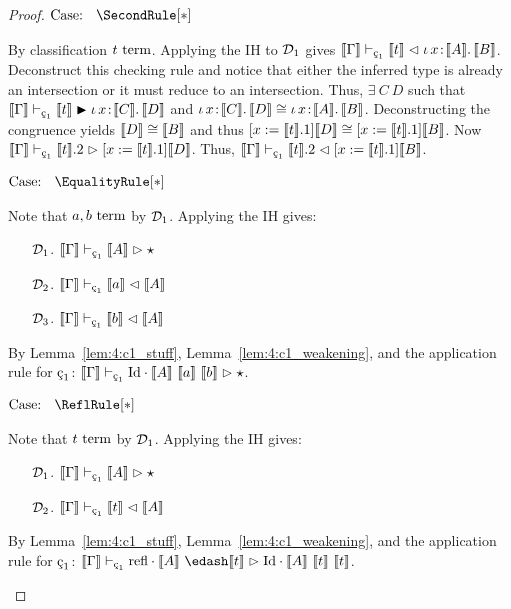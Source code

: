 \begin{proof}
    $\text{Case: }\begin{array}{c} \SecondRule[*] \end{array}$
    \begin{proofcase}
        By classification $t~\textnormal{term}$.
        Applying the IH to $\mathcal{D}_{1}$ gives $\sema{\Gamma} \vdash_{\oldced} \sema{t} \chck \abs{\iota}{x}{\sema{A}}{\sema{B}}$.
        Deconstruct this checking rule and notice that either the inferred type is already an intersection or it must reduce to an intersection.
        Thus, $\exists\ C\ D$ such that $\sema{\Gamma} \vdash_{\oldced} \sema{t} \cinfr \abs{\iota}{x}{\sema{C}}{\sema{D}}$ and ${\iota}\, x\! : \! \llbracket C \rrbracket.\, \llbracket D \rrbracket \cong {\iota}\, x\! : \! \llbracket A \rrbracket.\, \llbracket B \rrbracket$.
        Deconstructing the congruence yields $\llbracket D \rrbracket \cong \llbracket B \rrbracket$ and thus $[x := \llbracket t \rrbracket.1]\llbracket D \rrbracket \cong [x := \llbracket t \rrbracket.1]\llbracket B \rrbracket$.
        Now $\sema{\Gamma} \vdash_{\oldced} \sema{t}.2 \infr [x := \sema{t}.1]\sema{D}$.
        Thus, $\sema{\Gamma} \vdash_{\oldced} \sema{t}.2 \chck [x := \sema{t}.1]\sema{B}$.
    \end{proofcase}

    $\text{Case: }\begin{array}{c} \EqualityRule[*] \end{array}$
    \begin{proofcase}
        Note that $a, b~\textnormal{term}$ by $\mathcal{D}_{1}$.
        Applying the IH gives:
        \begin{enumerate}
            \item[$\mathcal{D}_{1}$.] $\sema{\Gamma} \vdash_{\oldced} \sema{A} \infr \star$
            \item[$\mathcal{D}_{2}$.] $\sema{\Gamma} \vdash_{\oldced} \sema{a} \chck \sema{A}$
            \item[$\mathcal{D}_{3}$.] $\sema{\Gamma} \vdash_{\oldced} \sema{b} \chck \sema{A}$
        \end{enumerate}
        By Lemma~\ref{lem:4:c1_stuff}, Lemma~\ref{lem:4:c1_weakening}, and the application rule for $\oldced$: $\sema{\Gamma} \vdash_{\oldced} \cId \cdot \sema{A}\ \sema{a}\ \sema{b} \infr \star$.
    \end{proofcase}

    $\text{Case: }\begin{array}{c} \ReflRule[*] \end{array}$
    \begin{proofcase}
        Note that $t~\textnormal{term}$ by $\mathcal{D}_{1}$.
        Applying the IH gives:
        \begin{enumerate}
            \item[$\mathcal{D}_{1}$.] $\sema{\Gamma} \vdash_{\oldced} \sema{A} \infr \star$
            \item[$\mathcal{D}_{2}$.] $\sema{\Gamma} \vdash_{\oldced} \sema{t} \chck \sema{A}$
        \end{enumerate}
        By Lemma~\ref{lem:4:c1_stuff}, Lemma~\ref{lem:4:c1_weakening}, and the application rule for $\oldced$: $\sema{\Gamma} \vdash_{\oldced} \crefl \cdot \sema{A}\ \edash \sema{t} \infr \cId \cdot \sema{A}\ \sema{t}\ \sema{t}$.
    \end{proofcase}


\end{proof}
